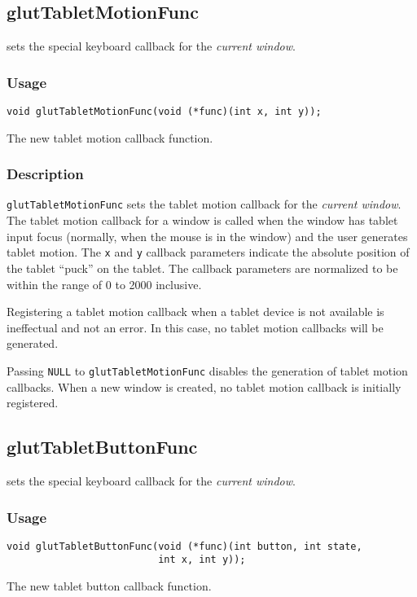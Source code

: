 \subsection{glutTabletMotionFunc}

 sets the special keyboard callback for the {\em current window}.

\subsubsection*{Usage}
\begin{verbatim}
void glutTabletMotionFunc(void (*func)(int x, int y));
\end{verbatim}
\begin{description}
\itemsep 0in
\item[{\tt func}]
The new tablet motion callback function.
\end{description}

\subsubsection*{Description}

{\tt glutTabletMotionFunc} sets the tablet motion callback for the {\em
current window}.  The tablet motion callback for a window is called when the
window has tablet input focus (normally, when the mouse is in the window)
and the user generates tablet motion.  The {\tt x} and {\tt y}
callback parameters indicate the absolute position of the tablet ``puck'' on
the tablet.
The callback parameters are normalized to be within the range of 0 to 2000
inclusive.

Registering a tablet motion callback when a tablet device is not available
is ineffectual and not an error.  In this case, no tablet motion callbacks
will be generated.

Passing {\tt NULL} to {\tt glutTabletMotionFunc} disables the generation of
tablet motion callbacks.  When a new window is created, no
tablet motion callback is initially registered.

\subsection{glutTabletButtonFunc}

 sets the special keyboard callback for the {\em current window}.

\subsubsection*{Usage}
\begin{verbatim}
void glutTabletButtonFunc(void (*func)(int button, int state,
                          int x, int y));
\end{verbatim}
\begin{description}
\itemsep 0in
\item[{\tt func}]
The new tablet button callback function.
\end{description}

